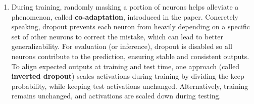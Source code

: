 \begin{parts}
\begin{subparts}
{\begin{enumerate}[label=\roman*.]
                \begin{equation}
                \gamma (1 - p_{\text{drop}}) \bh = \bh \Rightarrow \gamma = \frac{1}{1 - p_{\text{drop}}}
                \end{equation}
                
                \item
                During training, randomly masking a portion of neurons helps alleviate a phenomenon, called \textbf{co-adaptation}, introduced in the paper. Concretely speaking, dropout prevents each neuron from heavily depending on a specific set of other neurons to correct the mistake, which can lead to better generalizability.\newline
                For evaluation (or inference), dropout is disabled so all neurons contribute to the prediction, ensuring stable and consistent outputs. To align expected outputs at training and test time, one approach (called \textbf{inverted dropout}) scales activations during training by dividing the keep probability, while keeping test activations unchanged. Alternatively, training remains unchanged, and activations are scaled down during testing.
                
                \end{enumerate}
            }
          
         
        \end{subparts}


\end{parts}
